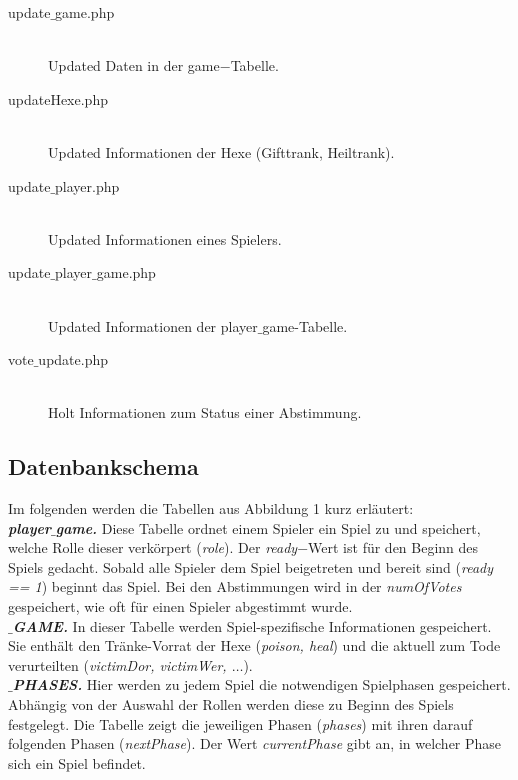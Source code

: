 \documentclass[12pt, a4paper]{article}
\begin{document}
\begin{description}
\item[update$\_$game.php]\hfill \\
Updated Daten in der game$-$Tabelle.
	
\item[updateHexe.php]\hfill \\
Updated Informationen der Hexe (Gifttrank, Heiltrank).
	
\item[update$\_$player.php]\hfill \\
Updated Informationen eines Spielers.
	
\item[update$\_$player$\_$game.php]\hfill \\
Updated Informationen der player$\_$game-Tabelle.
	
\item[vote$\_$update.php]\hfill \\
Holt Informationen zum Status einer Abstimmung.


\end{description}

		
\subsection{Datenbankschema}
			
Im folgenden werden die Tabellen aus Abbildung 1 kurz erläutert:
\\		
		
\textbf{\textit{player$\_$game.}}
Diese Tabelle ordnet einem Spieler ein Spiel zu und speichert, welche Rolle dieser verkörpert (\textit{role}). Der \textit{ready}$-$Wert ist für den Beginn des Spiels gedacht. Sobald alle Spieler dem Spiel beigetreten und bereit sind (\textit{ready == 1}) beginnt das Spiel. Bei den Abstimmungen wird in der \textit{numOfVotes} gespeichert, wie oft für einen Spieler abgestimmt wurde.
\\

\textbf{\textit{$\_$GAME.}}
In dieser Tabelle werden Spiel-spezifische Informationen gespeichert. Sie enthält den Tränke-Vorrat der Hexe (\textit{poison, heal}) und die aktuell zum Tode verurteilten (\textit{victimDor, victimWer, $\dots$}).
\\

\textbf{\textit{$\_$PHASES.}}
Hier werden zu jedem Spiel die notwendigen Spielphasen gespeichert. Abhängig von der Auswahl der Rollen werden diese zu Beginn des Spiels festgelegt. Die Tabelle zeigt die jeweiligen Phasen (\textit{phases}) mit ihren darauf folgenden Phasen (\textit{nextPhase}). Der Wert \textit{currentPhase} gibt an, in welcher Phase sich ein Spiel befindet.
\\
\end{document}
